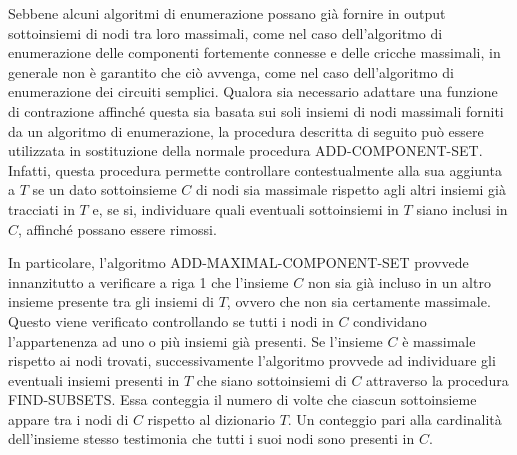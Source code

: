 


\newpage


Sebbene alcuni algoritmi di enumerazione possano già fornire in output sottoinsiemi di nodi tra loro massimali,
come nel caso dell'algoritmo di enumerazione delle componenti fortemente connesse e delle cricche massimali,
in generale non è garantito che ciò avvenga, come nel caso dell'algoritmo di enumerazione dei circuiti semplici.
Qualora sia necessario adattare una funzione di contrazione affinché questa sia basata sui soli insiemi di nodi
massimali forniti da un algoritmo di enumerazione, la procedura descritta di seguito può essere utilizzata in
sostituzione della normale procedura ADD-COMPONENT-SET\@.
Infatti, questa procedura permette controllare contestualmente alla sua aggiunta a $T$ se un dato sottoinsieme $C$ di
nodi sia massimale rispetto agli altri insiemi già tracciati in $T$ e, se si, individuare quali eventuali sottoinsiemi
in $T$ siano inclusi in $C$, affinché possano essere rimossi.




In particolare, l'algoritmo ADD-MAXIMAL-COMPONENT-SET provvede innanzitutto a verificare a riga 1 che l'insieme $C$ non
sia gi\`a incluso in un altro insieme presente tra gli insiemi di $T$, ovvero che non sia certamente
massimale.
Questo viene verificato controllando se tutti i nodi in $C$ condividano l'appartenenza ad uno o pi\`u insiemi gi\`a
presenti. \newline
Se l'insieme $C$ \`e massimale rispetto ai nodi trovati, successivamente l'algoritmo provvede ad individuare
gli eventuali insiemi presenti in $T$ che siano sottoinsiemi di $C$ attraverso la procedura FIND-SUBSETS\@.
Essa conteggia il numero di volte che ciascun sottoinsieme appare tra i nodi di $C$ rispetto al dizionario $T$.
Un conteggio pari alla cardinalit\`a dell'insieme stesso testimonia che tutti i suoi nodi sono presenti in $C$.

